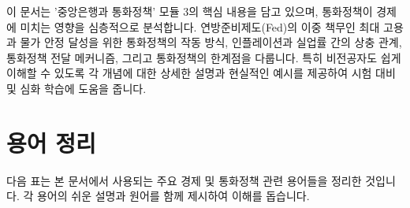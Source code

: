 \documentclass[11pt,a4paper]{book}
\theoremstyle{definition}
\begin{document}
이 문서는 '중앙은행과 통화정책' 모듈 3의 핵심 내용을 담고 있으며, 통화정책이 경제에 미치는 영향을 심층적으로 분석합니다. 연방준비제도(Fed)의 이중 책무인 최대 고용과 물가 안정 달성을 위한 통화정책의 작동 방식, 인플레이션과 실업률 간의 상충 관계, 통화정책 전달 메커니즘, 그리고 통화정책의 한계점을 다룹니다. 특히 비전공자도 쉽게 이해할 수 있도록 각 개념에 대한 상세한 설명과 현실적인 예시를 제공하여 시험 대비 및 심화 학습에 도움을 줍니다.


\section{용어 정리}

다음 표는 본 문서에서 사용되는 주요 경제 및 통화정책 관련 용어들을 정리한 것입니다. 각 용어의 쉬운 설명과 원어를 함께 제시하여 이해를 돕습니다.
\end{document}
